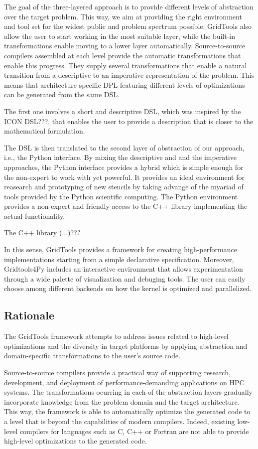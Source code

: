 \documentclass[english]{article}
\begin{document}
The goal of the three-layered approach is to provide different levels of abstraction over the target problem. 
This way, we aim at providing the right environment and tool set for the widest public and problem spectrum possible.
GridTools also allow the user to start working in the most suitable layer, while the built-in transformations enable moving to a lower layer automatically.
Source-to-source compilers assembled at each level provide the automatic transformations that enable this progress.
They supply several transformations that enable a natural transition from a descriptive to an imperative representation of the problem.
This means that architecture-specific DPL featuring different levels of optimizations can be generated from the same DSL.

The first one involves a short and descriptive DSL, which was inspired by the ICON DSL???, that enables the user to provide a description that is closer to the mathematical formulation.

The DSL is then translated to the second layer of abstraction of our approach, i.e., the Python interface.
By mixing the descriptive and and the imperative approaches, the Python interface provides a hybrid which is simple enough for the non-expert to work with yet powerful.
It provides an ideal environment for reasearch and prototyping of new stencils by taking advange of the myariad of tools provided by the Python scientific computing.
The Python environment provides a non-expert and friendly access to the C++ library implementing the actual functionality.

The C++ library (...)???

In this sense, GridTools provides a framework for creating high-performance implementations starting from a simple declarative specification. 
Moreover, Gridtools4Py includes an interactive environment that allows experimentation through a wide palette of visualization and debuging tools.
The user can easily choose among different backends on how the kernel is optimized and parallelized.

\subsection*{Rationale}
The GridTools framework attempts to address issues related to high-level optimizations and the diversity in target platforms by applying abstraction and domain-specific transformations to the user's source code.

Source-to-source compilers provide a practical way of supporting research, development, and deployment of performance-demanding applications on HPC systems.
The transformations ocurring in each of the abstraction layers gradually incorporate knowledge from the problem domain and the target architecture.
This way, the framework is able to automatically optimize the generated code to a level that is beyond the capabilities of modern compilers.
Indeed, existing low-level compilers for languages such as C, C++ or Fortran are not able to provide high-level optimizations to the generated code. 
\end{document}
